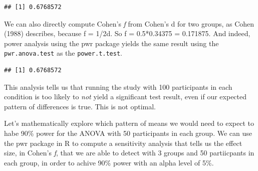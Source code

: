 \documentclass[]{book}
\newenvironment{Shaded}{\begin{snugshade}}{\end{snugshade}}
\newcommand{\DataTypeTok}[1]{\textcolor[rgb]{0.13,0.29,0.53}{#1}}
\newcommand{\DecValTok}[1]{\textcolor[rgb]{0.00,0.00,0.81}{#1}}
\newcommand{\FloatTok}[1]{\textcolor[rgb]{0.00,0.00,0.81}{#1}}
\newcommand{\KeywordTok}[1]{\textcolor[rgb]{0.13,0.29,0.53}{\textbf{#1}}}
\newcommand{\NormalTok}[1]{#1}
\newcommand{\OperatorTok}[1]{\textcolor[rgb]{0.81,0.36,0.00}{\textbf{#1}}}
\newcommand{\StringTok}[1]{\textcolor[rgb]{0.31,0.60,0.02}{#1}}
\begin{document}
\begin{Shaded}
\end{Shaded}

\begin{verbatim}
## [1] 0.6768572
\end{verbatim}

We can also directly compute Cohen's \emph{f} from Cohen's d for two groups, as Cohen (1988) describes, because f = 1/2d. So f = 0.5*0.34375 = 0.171875. And indeed, power analysis using the pwr package yields the same result using the \texttt{pwr.anova.test} as the \texttt{power.t.test}.

\begin{Shaded}
\end{Shaded}

\begin{verbatim}
## [1] 0.6768572
\end{verbatim}

This analysis tells us that running the study with 100 participants in each condition is too likely to \emph{not} yield a significant test result, even if our expected pattern of differences is true. This is not optimal.

Let's mathematically explore which pattern of means we would need to expect to habe 90\% power for the ANOVA with 50 participants in each group. We can use the pwr package in R to compute a sensitivity analysis that tells us the effect size, in Cohen's \emph{f}, that we are able to detect with 3 groups and 50 partiicpants in each group, in order to achive 90\% power with an alpha level of 5\%.
\end{document}
